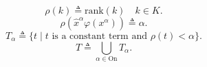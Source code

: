 $$\rho(k) \triangleq \text{rank}(k) \quad k \in K.$$
$$\rho(\hat{x}^\alpha \varphi(x^\alpha)) \triangleq \alpha.$$
$$T_\alpha \triangleq \{t \mid t \text{ is a constant term and } \rho(t) < \alpha\}.$$
$$T \triangleq \bigcup_{\alpha \in \text{On}} T_\alpha.$$
